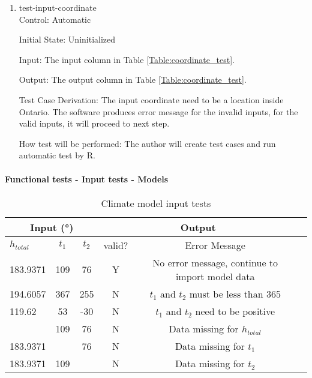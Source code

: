 \documentclass[12pt, titlepage]{article}
\begin{document}
\begin{enumerate}

\item{test-input-coordinate\\}
Control: Automatic
					
Initial State: Uninitialized
					
Input: The input column in Table \ref{Table:coordinate_test}.
					
Output: The output column in Table \ref{Table:coordinate_test}. 

Test Case Derivation: The input coordinate need to be a location inside Ontario. The software produces error message for the invalid inputs, for the valid inputs, it will proceed to next step. 
					
How test will be performed: The author will create test cases and run automatic test by R.
\end{enumerate}

\paragraph{Functional tests - Input tests - Models}

\begin{center}
\begin{table}[h]
\resizebox{\textwidth}{!}
{ %
    \begin{tabular}{ lcc|ccc }
    \hline
      \multicolumn{3}{c|}{Input (\si[per-mode=symbol] {\degree}) }                            & \multicolumn{2}{c}{Output} \\ \hline
        $h_{total}$   &   $t_1$   & $t_2$  &   valid?   &   Error Message \\ \hline
    
       183.9371  & 109 & 76 &  Y  & No error message, continue to import model data  \\    \hline
       194.6057  & 367 & 255 &  N  &  $t_1$ and $t_2$ must be less than 365  \\    \hline
       119.62  & 53 & -30 &  N  & $t_1$ and $t_2$ need to be positive                 \\    \hline  
         & 109 & 76 &  N  & Data missing for $h_{total}$                \\    \hline  
       183.9371  &  & 76 &   N  & Data missing for  $t_1$                    \\    \hline
       183.9371  & 109 &  &  N  & Data missing for  $t_2$                       \\    \hline
    \end{tabular} %
}
\caption{Climate model input tests}
\label{Table:climate_test}
\end{table}
\end{center}
\end{document}
